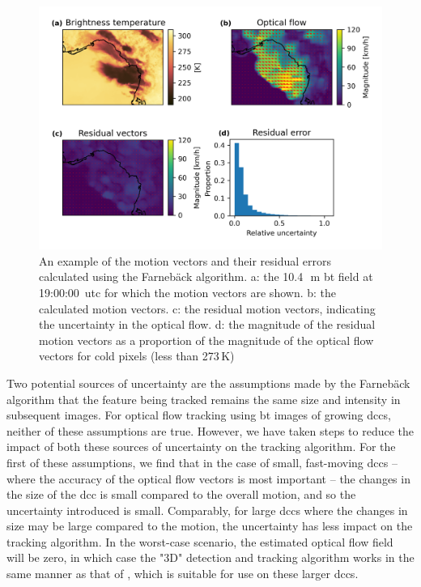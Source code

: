\begin{figure}[tp]
    \includegraphics[width=\textwidth]{figures/chapter1_14.png}
    \caption[
    An example of the motion vectors and their residual errors calculated using the Farnebäck algorithm
    ]{
    An example of the motion vectors and their residual errors calculated using the Farnebäck algorithm. a: the 10.4\,\unit{\mu m} \acrshort{bt} field at 19:00:00~\acrshort{utc} for which the motion vectors are shown. b: the calculated motion vectors. c: the residual motion vectors, indicating the uncertainty in the optical flow. d: the magnitude of the residual motion vectors as a proportion of the magnitude of the optical flow vectors for cold pixels (less than 273\,\unit{K})
    }
    \label{fig:optical_flow}
\end{figure}


Two potential sources of uncertainty are the assumptions made by the Farnebäck algorithm that the feature being tracked remains the same size and intensity in subsequent images.
For optical flow tracking using \acrshort{bt} images of growing \acrshort{dcc}s, neither of these assumptions are true.
However, we have taken steps to reduce the impact of both these sources of uncertainty on the tracking algorithm.
For the first of these assumptions, we find that in the case of small, fast-moving \acrshort{dcc}s -- where the accuracy of the optical flow vectors is most important -- the changes in the size of the \acrshort{dcc} is small compared to the overall motion, and so the uncertainty introduced is small.
Comparably, for large \acrshort{dcc}s where the changes in size may be large compared to the motion, the uncertainty has less impact on the tracking algorithm.
In the worst-case scenario, the estimated optical flow field will be zero, in which case the "3D" detection and tracking algorithm works in the same manner as that of \citet{fiolleau_algorithm_2013}, which is suitable for use on these larger \acrshort{dcc}s.

